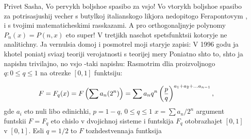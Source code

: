 

             Privet Sasha,
     Vo pervykh boljshoe spasibo za vsjo!
    Vo vtorykh boljshoe spasibo za
potrisasjushij vecher s butylkoj italianskogo
likjora nedopitogo Ferapontovym , i s tvojimi 
matematicheskimi rasskazami. A pro
orthogonaljnyje polynomy $P_n(x)=P(n,x)$
          eto super!
     V tretjikh naschot  spetsfunktsii kotoryje
ne analitichny.
    Ja vernulsia domoj i posmotrel moji staryje zapisi:
V 1996 godu ja khotel  poniatj sviazj teoriji verojatnosti
s teorijej mery
Poniatno shto to, shto ja napishu trivilajno, no
   vsjo -taki napishu:
  Rasmotrim dlia proizvoljnogo $q\colon 0\leq q\leq 1$
    na otrezke $[0,1]$ funktsiju:

          $$
    F=F_q(x)=F\left(\sum {a_n(2^n)}\right)=
      \sum a_nq^n
    \left(p\over q\right)^{a_1+a_2+\dots a_{n-1}},
          $$
gde $a_i$ eto nuli libo edinichki, $p=1-q$, $0\leq q\leq 1$
      $x=\sum a_n/2^n$
argument funtskii  $F=F_q$
eto chislo v dvojichnoj sisteme
i funtskija $F_q$ otobrazhajet $[0,1]$ v $[0,1]$.
    Esli $q=1/2$ to $F$ tozhdestvennaja funtksija

